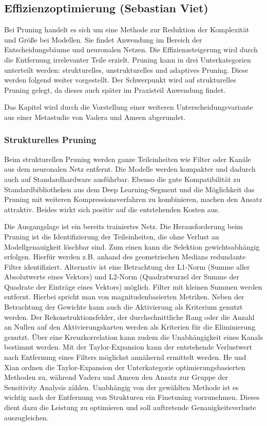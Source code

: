 \subsection{Effizienzoptimierung (Sebastian Viet)}

Bei Pruning handelt es sich um eine Methode zur Reduktion der Komplexität und
Größe bei Modellen. Sie findet Anwendung im Bereich der Entscheidungsbäume und
neuronalen Netzen. Die Effizienzsteigerung wird durch die Entfernung
irrelevanter Teile erzielt. Pruning kann in drei Unterkategorien unterteilt
werden: strukturelles, unstrukturelles und adaptives Pruning. Diese werden
folgend weiter vorgestellt. Der Schwerpunkt wird auf strukturelles Pruning
gelegt, da dieses auch später im Praxisteil Anwendung findet.

Das Kapitel wird durch die Vorstellung einer weiteren Unterscheidungsvariante
aus einer Metastudie von Vadera und Ameen abgerundet.

\subsubsection{Strukturelles Pruning}

Beim strukturellen Pruning werden ganze Teileinheiten wie Filter oder Kanäle
aus dem neuronalen Netz entfernt. Die Modelle werden kompakter und dadurch auch
auf Standardhardware ausführbar. Ebenso die gute Kompatibilität zu
Standardbibliotheken aus dem Deep Learning-Segment und die Möglichkeit das
Pruning mit weiteren Kompressionsverfahren zu kombinieren, machen den Ansatz
attraktiv. Beides wirkt sich positiv auf die entstehenden Kosten aus.
\autocites[Vgl.][S. 1]{he2023structured}[S. 1-2]{vadera2022methods}

Die Ausgangslage ist ein bereits trainiertes Netz. Die Herausforderung beim
Pruning ist die Identifizierung der Teileinheiten, die ohne Verlust an
Modellgenauigkeit löschbar sind. Zum einen kann die Selektion gewichtsabhängig
erfolgen. Hierfür werden z.B. anhand des geometrischen Medians redundante
Filter identifiziert. Alternativ ist eine Betrachtung der L1-Norm (Summe aller
Absolutwerte eines Vektors) und L2-Norm (Quadratwurzel der Summe der Quadrate
der Einträge eines Vektors) möglich. Filter mit kleinen Summen werden entfernt.
Hierbei spricht man von magnitudenbasierten Metriken. Neben der Betrachtung
der Gewichte kann auch die Aktivierung als Kriterium genutzt werden. Der
Rekonstruktionsfehler, der durchschnittliche Rang oder die Anzahl an Nullen
auf den Aktivierungskarten werden als Kriterien für die Eliminierung genutzt.
Über eine Kreuzkorrelation kann zudem die Unabhängigkeit eines Kanals bestimmt
werden. Mit der Taylor-Expansion kann der entstehende Verlustwert nach
Entfernung eines Filters möglichst annähernd ermittelt werden. He und Xian
ordnen die Taylor-Expansion der Unterkategorie optimierungsbasierten Methoden
zu, während Vadera und Ameen den Ansatz zur Gruppe der Sensitivity Analysis
zählen. Unabhängig von der gewählten Methode ist es wichtig nach der Entfernung
von Strukturen ein Finetuning vorzunehmen. Dieses dient dazu die Leistung zu
optimieren und soll auftretende Genauigkeitsverluste auszugleichen. \autocites[Vgl.][S. 1-5]{he2023structured}[S. 1-5]{vadera2022methods}


